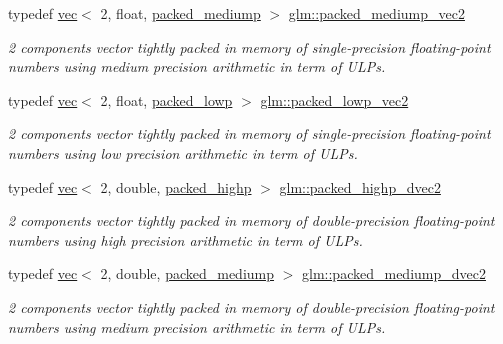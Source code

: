 \begin{DoxyCompactItemize}
typedef \mbox{\hyperlink{structglm_1_1vec}{vec}}$<$ 2, float, \mbox{\hyperlink{namespaceglm_a36ed105b07c7746804d7fdc7cc90ff25a9604654c3b137cd7898689fd34b25bc0}{packed\+\_\+mediump}} $>$ \mbox{\hyperlink{group__gtc__type__aligned_ga16f6a2ad499160b96c263f7f216a70e2}{glm\+::packed\+\_\+mediump\+\_\+vec2}}
\begin{DoxyCompactList}\small\item\em 2 components vector tightly packed in memory of single-\/precision floating-\/point numbers using medium precision arithmetic in term of U\+L\+Ps. \end{DoxyCompactList}\item 
typedef \mbox{\hyperlink{structglm_1_1vec}{vec}}$<$ 2, float, \mbox{\hyperlink{namespaceglm_a36ed105b07c7746804d7fdc7cc90ff25ac36a4bd74559be2c0b65bc48e5953b8b}{packed\+\_\+lowp}} $>$ \mbox{\hyperlink{group__gtc__type__aligned_ga5457fdfd08276277a86cb27e1da6aa9c}{glm\+::packed\+\_\+lowp\+\_\+vec2}}
\begin{DoxyCompactList}\small\item\em 2 components vector tightly packed in memory of single-\/precision floating-\/point numbers using low precision arithmetic in term of U\+L\+Ps. \end{DoxyCompactList}\item 
typedef \mbox{\hyperlink{structglm_1_1vec}{vec}}$<$ 2, double, \mbox{\hyperlink{namespaceglm_a36ed105b07c7746804d7fdc7cc90ff25a8e8791ee77fe079b1291f710d88031bf}{packed\+\_\+highp}} $>$ \mbox{\hyperlink{group__gtc__type__aligned_ga8c26414d99b8996aa7dc73e1dc8a06bd}{glm\+::packed\+\_\+highp\+\_\+dvec2}}
\begin{DoxyCompactList}\small\item\em 2 components vector tightly packed in memory of double-\/precision floating-\/point numbers using high precision arithmetic in term of U\+L\+Ps. \end{DoxyCompactList}\item 
typedef \mbox{\hyperlink{structglm_1_1vec}{vec}}$<$ 2, double, \mbox{\hyperlink{namespaceglm_a36ed105b07c7746804d7fdc7cc90ff25a9604654c3b137cd7898689fd34b25bc0}{packed\+\_\+mediump}} $>$ \mbox{\hyperlink{group__gtc__type__aligned_ga5cbf23f43f82491a631c35ca8664ae0b}{glm\+::packed\+\_\+mediump\+\_\+dvec2}}
\begin{DoxyCompactList}\small\item\em 2 components vector tightly packed in memory of double-\/precision floating-\/point numbers using medium precision arithmetic in term of U\+L\+Ps. \end{DoxyCompactList}\item 

\end{DoxyCompactItemize}
